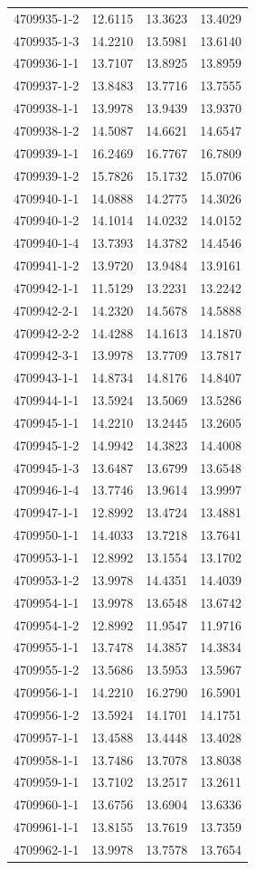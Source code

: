\begin{longtable}{lrrr}
4709935-1-2 & 12.6115 & 13.3623 & 13.4029 \\
4709935-1-3 & 14.2210 & 13.5981 & 13.6140 \\
4709936-1-1 & 13.7107 & 13.8925 & 13.8959 \\
4709937-1-2 & 13.8483 & 13.7716 & 13.7555 \\
4709938-1-1 & 13.9978 & 13.9439 & 13.9370 \\
4709938-1-2 & 14.5087 & 14.6621 & 14.6547 \\
4709939-1-1 & 16.2469 & 16.7767 & 16.7809 \\
4709939-1-2 & 15.7826 & 15.1732 & 15.0706 \\
4709940-1-1 & 14.0888 & 14.2775 & 14.3026 \\
4709940-1-2 & 14.1014 & 14.0232 & 14.0152 \\
4709940-1-4 & 13.7393 & 14.3782 & 14.4546 \\
4709941-1-2 & 13.9720 & 13.9484 & 13.9161 \\
4709942-1-1 & 11.5129 & 13.2231 & 13.2242 \\
4709942-2-1 & 14.2320 & 14.5678 & 14.5888 \\
4709942-2-2 & 14.4288 & 14.1613 & 14.1870 \\
4709942-3-1 & 13.9978 & 13.7709 & 13.7817 \\
4709943-1-1 & 14.8734 & 14.8176 & 14.8407 \\
4709944-1-1 & 13.5924 & 13.5069 & 13.5286 \\
4709945-1-1 & 14.2210 & 13.2445 & 13.2605 \\
4709945-1-2 & 14.9942 & 14.3823 & 14.4008 \\
4709945-1-3 & 13.6487 & 13.6799 & 13.6548 \\
4709946-1-4 & 13.7746 & 13.9614 & 13.9997 \\
4709947-1-1 & 12.8992 & 13.4724 & 13.4881 \\
4709950-1-1 & 14.4033 & 13.7218 & 13.7641 \\
4709953-1-1 & 12.8992 & 13.1554 & 13.1702 \\
4709953-1-2 & 13.9978 & 14.4351 & 14.4039 \\
4709954-1-1 & 13.9978 & 13.6548 & 13.6742 \\
4709954-1-2 & 12.8992 & 11.9547 & 11.9716 \\
4709955-1-1 & 13.7478 & 14.3857 & 14.3834 \\
4709955-1-2 & 13.5686 & 13.5953 & 13.5967 \\
4709956-1-1 & 14.2210 & 16.2790 & 16.5901 \\
4709956-1-2 & 13.5924 & 14.1701 & 14.1751 \\
4709957-1-1 & 13.4588 & 13.4448 & 13.4028 \\
4709958-1-1 & 13.7486 & 13.7078 & 13.8038 \\
4709959-1-1 & 13.7102 & 13.2517 & 13.2611 \\
4709960-1-1 & 13.6756 & 13.6904 & 13.6336 \\
4709961-1-1 & 13.8155 & 13.7619 & 13.7359 \\
4709962-1-1 & 13.9978 & 13.7578 & 13.7654 \\
\end{longtable}
